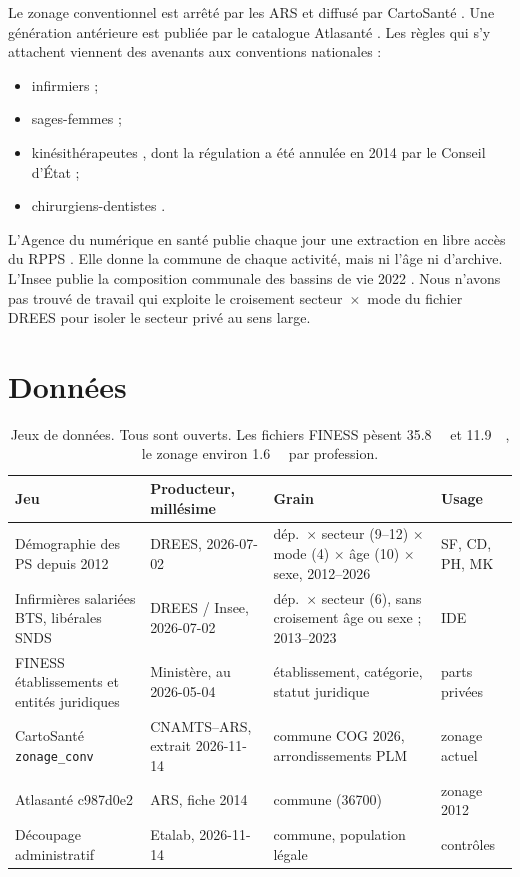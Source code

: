 Le zonage conventionnel est arrêté par les ARS et diffusé par CartoSanté \citep{a4-cartosante2026}. Une génération
antérieure est publiée par le catalogue Atlasanté \citep{a4-atlasante2014zonage}. Les règles qui s'y attachent
viennent des avenants aux conventions nationales :
\begin{itemize}
  \item infirmiers \citep{a4-ameliIde} ;
  \item sages-femmes \citep{a4-ameliSf} ;
  \item kinésithérapeutes \citep{a4-ameliMk}, dont la régulation a été annulée en 2014 par le Conseil d'État
  \citep{a4-ce2014mk} ;
  \item chirurgiens-dentistes \citep{a4-arspaca2025cd}.
\end{itemize}
L'Agence du numérique en santé publie chaque jour une extraction en libre accès du RPPS \citep{a4-ans2026annuaire}.
Elle donne la commune de chaque activité, mais ni l'âge ni d'archive. L'Insee publie la composition communale
des bassins de vie 2022 \citep{a4-insee2026bv}.
Nous n'avons pas trouvé de travail qui exploite le croisement secteur~$\times$~mode du fichier DREES pour isoler
le secteur privé au sens large.

\section{Données}
\begin{table}[h]
\centering\small
\begin{tabular}{@{}p{4.2cm}p{3.1cm}p{4.3cm}p{3.2cm}@{}}
\toprule
Jeu & Producteur, millésime & Grain & Usage \\
\midrule
Démographie des PS depuis 2012 \citep{a4-drees2026demo} & DREES, 2026-07-02 & dép.\ $\times$ secteur (9--12) $\times$ mode (4) $\times$ âge (10) $\times$ sexe, 2012--2026 & SF, CD, PH, MK \\
Infirmières salariées BTS, libérales SNDS \citep{a4-dreesbts2026} & DREES / Insee, 2026-07-02 & dép.\ $\times$ secteur (6), sans croisement âge ou sexe ; 2013--2023 & IDE \\
FINESS établissements et entités juridiques \citep{a4-finessEt2026,a4-finessEj2026} & Ministère, au 2026-05-04 & établissement, catégorie, statut juridique & parts privées \\
CartoSanté \texttt{zonage\_conv} \citep{a4-cartosante2026} & CNAMTS--ARS, extrait 2026-11-14 & commune COG 2026, arrondissements PLM & zonage actuel \\
Atlasanté c987d0e2 \citep{a4-atlasante2014zonage} & ARS, fiche 2014 & commune (\num{36700}) & zonage 2012 \\
Découpage administratif \citep{a4-geoapi2026} & Etalab, 2026-11-14 & commune, population légale & contrôles \\
\bottomrule
\end{tabular}
\caption{Jeux de données. Tous sont ouverts. Les fichiers FINESS pèsent \SI{35.8}{\mega\byte} et
\SI{11.9}{\mega\byte}\mesure{}, le zonage environ \SI{1.6}{\mega\byte} par profession\mesure{}.}
\label{a4-tab:donnees}
\end{table}

